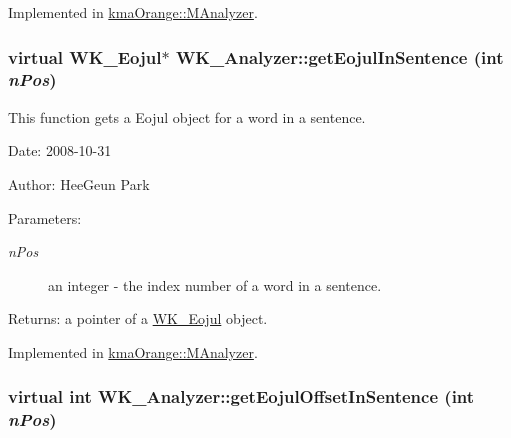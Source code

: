 Implemented in \hyperlink{classkmaOrange_1_1MAnalyzer_30edc86f54845667d82a941d7ba189ed}{kmaOrange::MAnalyzer}.\hypertarget{classWK__Analyzer_719d5064f2d397eff535805c37c8a251}{
\subsubsection[{getEojulInSentence}]{\setlength{\rightskip}{0pt plus 5cm}virtual {\bf WK\_\-Eojul}$\ast$ WK\_\-Analyzer::getEojulInSentence (int {\em nPos})}}
\label{classWK__Analyzer_719d5064f2d397eff535805c37c8a251}


This function gets a Eojul object for a word in a sentence. 

\begin{Desc}
\item[Date:]2008-10-31 \end{Desc}
\begin{Desc}
\item[Author:]HeeGeun Park \end{Desc}
\begin{Desc}
\item[Parameters:]
\begin{description}
\item[{\em nPos}]an integer - the index number of a word in a sentence. \end{description}
\end{Desc}
\begin{Desc}
\item[Returns:]a pointer of a \hyperlink{classWK__Eojul}{WK\_\-Eojul} object. \end{Desc}


Implemented in \hyperlink{classkmaOrange_1_1MAnalyzer_c2ea56d963f7cffd60d44671497e69a4}{kmaOrange::MAnalyzer}.\hypertarget{classWK__Analyzer_89f47ebc012b22c7762677a12877bc37}{
\subsubsection[{getEojulOffsetInSentence}]{\setlength{\rightskip}{0pt plus 5cm}virtual int WK\_\-Analyzer::getEojulOffsetInSentence (int {\em nPos})}}
\label{classWK__Analyzer_89f47ebc012b22c7762677a12877bc37}




